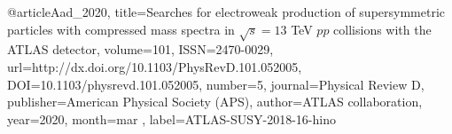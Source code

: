 @article{Aad_2020, 
    title={Searches for electroweak production of supersymmetric particles with compressed mass spectra in $\sqrt{s}=13$ TeV $pp$ collisions with the ATLAS detector}, 
    volume={101}, 
    ISSN={2470-0029}, 
    url={http://dx.doi.org/10.1103/PhysRevD.101.052005}, 
    DOI={10.1103/physrevd.101.052005}, 
    number={5}, 
    journal={Physical Review D}, 
    publisher={American Physical Society (APS)}, 
    author={ATLAS collaboration}, 
    year={2020}, 
    month=mar ,
    label={ATLAS-SUSY-2018-16-hino}
}
